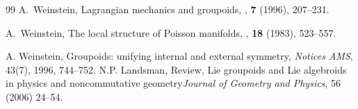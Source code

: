\documentclass{article}
\begin{document}
\begin{thebibliography}{99}
A.~Weinstein,
\newblock Lagrangian mechanics and groupoids,
, \textbf{7} (1996), 207--231.

A.~Weinstein,
\newblock The local structure of Poisson manifolds,
, \textbf{18} (1983), 523--557.

 A. Weinstein, Groupoids: unifying internal and external symmetry, \emph{Notices AMS}, 43(7), 1996, 744--752.
N.P. Landsman, Review, Lie groupoids and Lie algebroids in physics and noncommutative geometry\emph{Journal of Geometry and Physics}, 56 (2006) 24–54.





\end{thebibliography}
\end{document}
